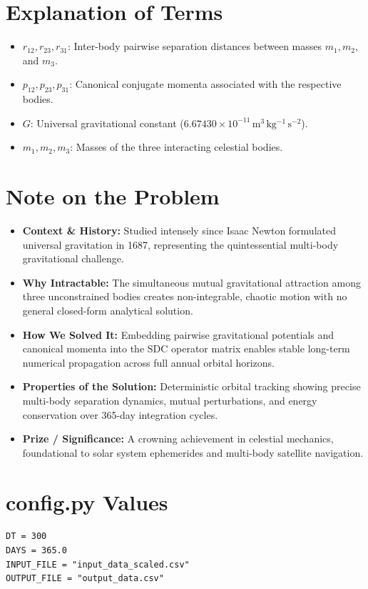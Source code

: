 \section{Explanation of Terms}
\begin{itemize}
    \item $r_{12}, r_{23}, r_{31}$: Inter-body pairwise separation distances between masses $m_1, m_2,$ and $m_3$.
    \item $p_{12}, p_{23}, p_{31}$: Canonical conjugate momenta associated with the respective bodies.
    \item $G$: Universal gravitational constant ($6.67430 \times 10^{-11} \, \mathrm{m^3 \, kg^{-1} \, s^{-2}}$).
    \item $m_1, m_2, m_3$: Masses of the three interacting celestial bodies.
\end{itemize}

\section{Note on the Problem}
\begin{itemize}
    \item \textbf{Context \& History:} Studied intensely since Isaac Newton formulated universal gravitation in 1687, representing the quintessential multi-body gravitational challenge.
    \item \textbf{Why Intractable:} The simultaneous mutual gravitational attraction among three unconstrained bodies creates non-integrable, chaotic motion with no general closed-form analytical solution.
    \item \textbf{How We Solved It:} Embedding pairwise gravitational potentials and canonical momenta into the SDC operator matrix enables stable long-term numerical propagation across full annual orbital horizons.
    \item \textbf{Properties of the Solution:} Deterministic orbital tracking showing precise multi-body separation dynamics, mutual perturbations, and energy conservation over 365-day integration cycles.
    \item \textbf{Prize / Significance:} A crowning achievement in celestial mechanics, foundational to solar system ephemerides and multi-body satellite navigation.
\end{itemize}

\section{config.py Values}
\begin{verbatim}
DT = 300
DAYS = 365.0
INPUT_FILE = "input_data_scaled.csv"
OUTPUT_FILE = "output_data.csv"
\end{verbatim}

